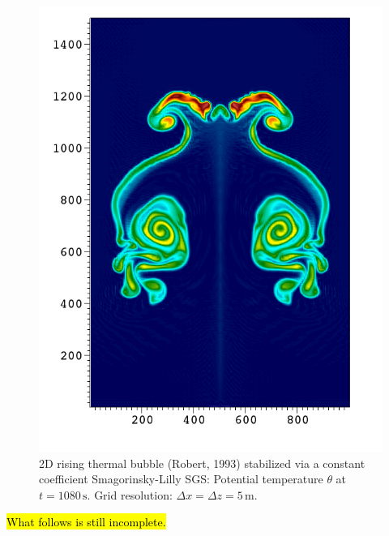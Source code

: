 \documentclass{report}
\begin{document}
\begin{figure}[htbp]
\includegraphics[width=\textwidth]{figures/RTB-Robert--smgo-5mX5m-1080s0000.png}
\caption{2D rising thermal bubble (Robert, 1993) stabilized via a constant coefficient Smagorinsky-Lilly SGS: Potential temperature $\theta$ at $t=1080\,\mathrm{s}$. Grid resolution: $\Delta x = \Delta z = 5\,\mathrm{m}$.}
\label{fig:benchmarks/robert5msmago}
\end{figure}

\hl{What follows is still incomplete.}
\end{document}
